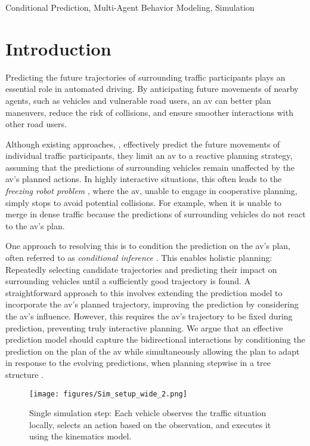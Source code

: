\documentclass[a4paper,12pt,onecolumn]{article}
\begin{document}
\begin{keywords}
Conditional Prediction, Multi-Agent Behavior Modeling, Simulation
\end{keywords}



\section{Introduction}
Predicting the future trajectories of surrounding traffic participants plays an essential role in automated driving. By anticipating future movements of nearby agents, such as vehicles and vulnerable road users, an \gls{av} can better plan maneuvers, reduce the risk of collisions, and ensure smoother interactions with other road users.

Although existing approaches, \eg \cite{Seff23MotionLM, Shi24MTR++, Wagner2024SceneMotion}, effectively predict the future movements of individual traffic participants, they limit an \gls{av} to a reactive planning strategy, assuming that the predictions of surrounding vehicles remain unaffected by the \gls{av}'s planned actions. In highly interactive situations, this often leads to the \emph{freezing robot problem} \cite{Trautmann10UnfreezingRobot}, where the \gls{av}, unable to engage in cooperative planning, simply stops to avoid potential collisions. For example, when it is unable to merge in dense traffic because the predictions of surrounding vehicles do not react to the \gls{av}'s plan.

One approach to resolving this is to condition the prediction on the \gls{av}'s plan, often referred to as \emph{conditional inference} \cite{Tolstaya21ConditionalInference}. This enables holistic planning: Repeatedly selecting candidate trajectories and predicting their impact on surrounding vehicles until a sufficiently good trajectory is found. A straightforward approach to this involves extending the prediction model to incorporate the \gls{av}'s planned trajectory, improving the prediction by considering the \gls{av}'s influence. However, this requires the \gls{av}'s trajectory to be fixed during prediction, preventing truly interactive planning. We argue that an effective prediction model should capture the bidirectional interactions by conditioning the prediction on the plan of the \gls{av} while simultaneously allowing the plan to adapt in response to the evolving predictions, \eg when planning stepwise in a tree structure \cite{Chen23TreeBasedPlanning}.

\begin{figure}[t]
\centering
\texttt{[image: figures/Sim\_setup\_wide\_2.png]}
\vspace{-12pt}
\caption{Single simulation step: Each vehicle observes the traffic situation locally, selects an action based on the observation, and executes it using the kinematics model.} 
\label{fig:sim}
\vspace{-12pt}
\end{figure}
\end{document}
